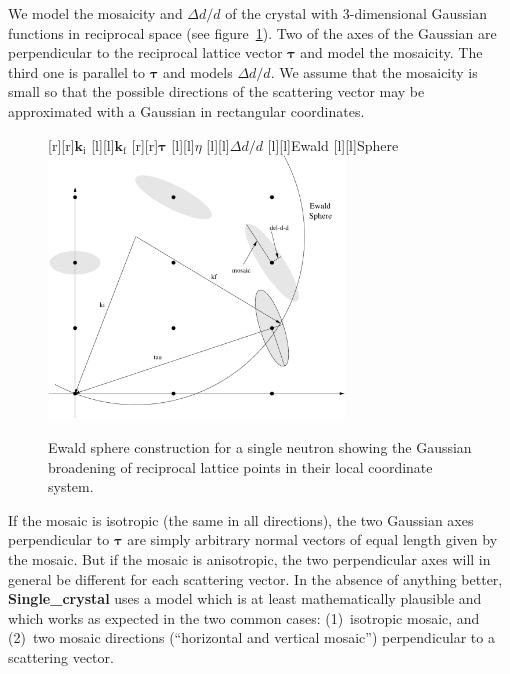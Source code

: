 We model the mosaicity and $\Delta d/d$ of the crystal with
3-dimensional Gaussian functions in reciprocal space (see
figure~\ref{fig:crystal-reciprocal-space}). Two of the axes of the
Gaussian are perpendicular to the reciprocal lattice vector $\boldsymbol{\tau}$ and model
the mosaicity. The third one is parallel to $\boldsymbol{\tau}$ and models
$\Delta d/d$. We assume that the
mosaicity is small so that the possible directions of the scattering
vector may be approximated with a Gaussian in rectangular
coordinates.
\begin{figure}[t]
  \begin{center}
    [r][r]{$\boldsymbol{k}_\textrm{i}$}
    [l][l]{$\boldsymbol{k}_\textrm{f}$}
    [r][r]{$\boldsymbol{\tau}$}
    [l][l]{$\eta$}
    [l][l]{$\Delta d/d$}
    [l][l]{Ewald}
    [l][l]{Sphere}
    \includegraphics[width=0.7\textwidth]{figures/recip_space3}
  \end{center}
\caption{Ewald sphere construction for a single neutron showing the
    Gaussian broadening of reciprocal lattice points in their local
    coordinate system.}
\label{fig:crystal-reciprocal-space}
\end{figure}

If the mosaic is isotropic (the same in all directions), the two
Gaussian axes perpendicular to $\boldsymbol{\tau}$ are simply arbitrary
normal vectors of equal length given by the mosaic. But if the mosaic
is anisotropic, the two perpendicular axes will in general be different
for each scattering vector. In the absence of anything better,
\textbf{Single\_crystal} uses a model which is at least mathematically
plausible and which works as expected in the two common cases:
(1)~isotropic mosaic, and (2)~two mosaic directions (``horizontal and
vertical mosaic'') perpendicular to a scattering vector.


